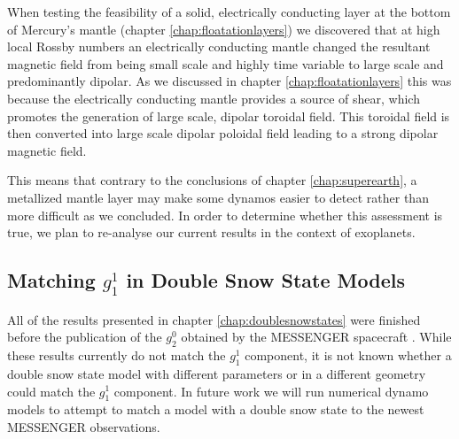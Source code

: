 When testing the feasibility of a solid, electrically conducting layer at the bottom of Mercury's mantle (chapter \ref{chap:floatationlayers}) we discovered that at high local Rossby numbers an electrically conducting mantle changed the resultant magnetic field from being small scale and highly time variable to large scale and predominantly dipolar. As we discussed in chapter \ref{chap:floatationlayers} this was because the electrically conducting mantle provides a source of shear, which promotes the generation of large scale, dipolar toroidal field. This toroidal field is then converted into large scale dipolar poloidal field leading to a strong dipolar magnetic field. 

This means that contrary to the conclusions of chapter \ref{chap:superearth}, a metallized mantle layer may make some dynamos easier to detect rather than more difficult as we concluded. In order to determine whether this assessment is true, we plan to re-analyse our current results in the context of exoplanets.

\subsection{Matching $g_1^1$ in Double Snow State Models}
All of the results presented in chapter \ref{chap:doublesnowstates} were finished before the publication of the $g_2^0$ obtained by the MESSENGER spacecraft \citep{anderson2012}. While these results currently do not match the $g_1^1$ component, it is not known whether a double snow state model with different parameters or in a different geometry could match the $g_1^1$ component. In future work we will run numerical dynamo models to attempt to match a model with a double snow state to the newest MESSENGER observations.